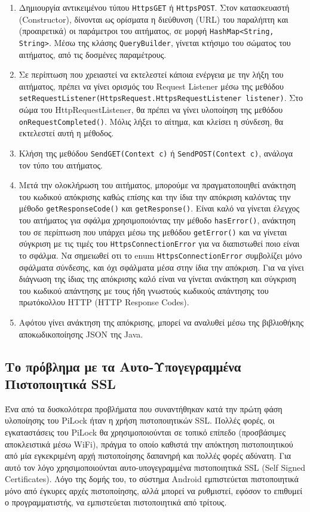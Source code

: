 	\begin{enumerate}
		\item Δημιουργία αντικειμένου τύπου \verb|HttpsGET| ή \verb|HttpsPOST|. Στον κατασκευαστή (Constructor), δίνονται ως ορίσματα η διεύθυνση (URL) του παραλήπτη και (προαιρετικά) οι παράμετροι του αιτήματος, σε μορφή \verb|HashMap<String, String>|. Μέσω της κλάσης \verb|QueryBuilder|, γίνεται κτήσιμο του σώματος του αιτήματος, από τις δοσμένες παραμέτρους.
		\item Σε περίπτωση που χρειαστεί να εκτελεστεί κάποια ενέργεια με την λήξη του αιτήματος, πρέπει να γίνει ορισμός του Request Listener μέσω της μεθόδου \verb|setRequestListener(HttpsRequest.HttpsRequestListener listener)|. Στο σώμα του HttpRequestListener, θα πρέπει να γίνει υλοποίηση της μεθόδου \verb|onRequestCompleted()|. Μόλις λήξει το αίτημα, και κλείσει η σύνδεση, θα εκτελεστεί αυτή η μέθοδος.
		\item Κλήση της μεθόδου \verb|SendGET(Context c)| ή \verb|SendPOST(Context c)|, ανάλογα τον τύπο του αιτήματος.
		\item Μετά την ολοκλήρωση του αιτήματος, μπορούμε να πραγματοποιηθεί ανάκτηση του κωδικού απόκρισης καθώς επίσης και την ίδια την απόκριση καλόντας την μέθοδο \verb|getResponseCode()| και \verb|getResponse()|. Είναι καλό να γίνεται έλεγχος του αιτήματος για σφάλμα χρησιμοποιόντας την μέθοδο \verb|hasError()|, ανάκτηση του σε περίπτωση που υπάρχει μέσω της μεθόδου \verb|getError()| και να γίνεται σύγκριση με τις τιμές του \verb|HttpsConnectionError| για να διαπιστωθεί ποιο είναι το σφάλμα. Να σημειωθεί οτι το enum \verb|HttpsConnectionError| συμβολίζει μόνο σφάλματα σύνδεσης, και όχι σφάλματα μέσα στην ίδια την απόκριση. Για να γίνει διάγνωση της ίδιας της απόκρισης καλό είναι να γίνεται ανάκτηση και σύγκριση του κωδικού απάντησης με τους ήδη γνωστούς κωδικούς απάντησης του πρωτόκολλου HTTP (HTTP Response Codes).
		\item Αφότου γίνει ανάκτηση της απόκρισης, μπορεί να αναλυθεί μέσω της βιβλιοθήκης αποκωδικοποίησης JSON της Java.
	\end{enumerate}

	\subsection{Το πρόβλημα με τα Αυτο-Υπογεγραμμένα Πιστοποιητικά SSL}
		Ένα από τα δυσκολότερα προβλήματα που συναντήθηκαν κατά την πρώτη φάση υλοποίησης του PiLock ήταν η χρήση πιστοποιητικών SSL. Πολλές φορές, οι εγκαταστάσεις του PiLock θα χρησιμοποιούνται σε τοπικό επίπεδο (προσβάσιμες αποκλειστικά μέσω WiFi), πράγμα το οποίο καθιστά την απόκτηση πιστοποιητικού από μία εγκεκριμένη αρχή πιστοποίησης δαπανηρή και πολλές φορές αδύνατη. Για αυτό τον λόγο χρησιμοποιούνται αυτο-υπογεγραμμένα πιστοποιητικά SSL (Self Signed Certificates). Λόγο της δομής του, το σύστημα Android εμπιστεύεται πιστοποιητικά μόνο από έγκυρες αρχές πιστοποίησης, αλλά μπορεί να ρυθμιστεί, εφόσον το επιθυμεί ο προγραμματιστής, να εμπιστεύεται πιστοποιητικά από τρίτους. 

